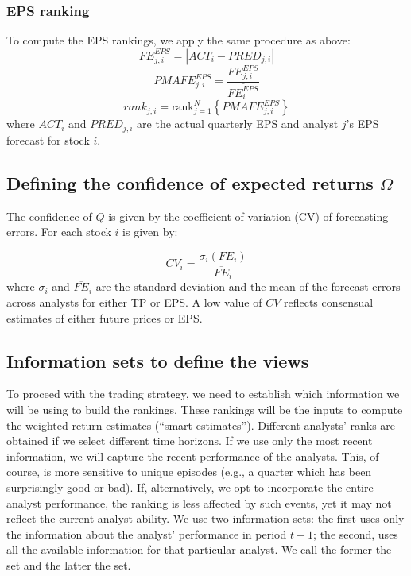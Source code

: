 \documentclass[a4paper,12pt,openright,notitlepage]{report}\usepackage[]{graphicx}\usepackage[]{color}
\begin{document}
\subsubsection{EPS ranking}
\label{ch1:sec-eps}
To compute the EPS rankings, we apply the same procedure as above:
\begin{equation}
FE_{j,i}^{EPS}=|{ACT_{i}-PRED_{j,i}}|
\end{equation}
\begin{equation}
PMAFE_{j,i}^{EPS}= \frac{FE_{j,i}^{EPS}}{\overline{FE_{i}^{EPS}}}
\end{equation}
\begin{equation}
\label{ch1-eps:rank}
rank_{j,i}=\mathrm{rank}_{j=1}^{N} \left\{ PMAFE_{j,i}^{EPS} \right\}
\end{equation}
where $ACT_{i}$ and $PRED_{j,i}$ are the actual quarterly EPS and  analyst $j$'s EPS forecast for stock $i$.


\subsection{Defining the confidence of expected returns $\Omega$}
\label{def-omega}
The confidence of $Q$ is given by the coefficient of variation (CV) of forecasting errors. For each stock $i$ is given by:

\begin{equation}
\label{eq-cv}
CV_{i} = \frac{\sigma_i (FE_{i})}{\overline{FE}_{i}}
\end{equation}
where $\sigma_i$ and $\overline{FE}_i$ are the standard deviation and the mean of the forecast errors across analysts for either TP or EPS. A low value of $CV$ reflects consensual estimates of either future prices or EPS.



\subsection{Information sets to define the views}
\label{inf-set}
To proceed with the trading strategy, we need to establish which information we  will be using to build the rankings. These rankings will be the inputs to compute the weighted return estimates (``smart estimates''). Different analysts' ranks are obtained  if we select different time horizons. If we use only the most  recent information, we will capture the recent performance of the analysts. This, of course, is more sensitive to unique episodes (e.g., a quarter which has been surprisingly good or bad). If, alternatively, we opt to incorporate the entire analyst performance, the ranking is less affected by such events, yet it may not reflect the current analyst ability. We use two information sets: the first uses only the  information about the analyst' performance in period $t-1$; the second, uses all the available  information for that particular analyst. We call the former the \naive{} set and the latter the  set.
\end{document}
